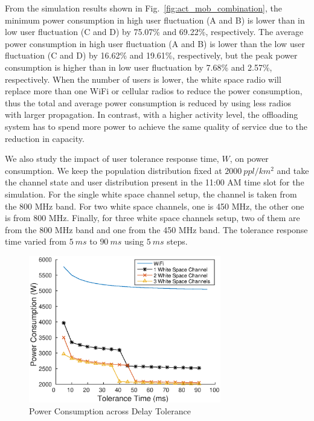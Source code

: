 From the simulation results shown in Fig.~\ref{fig:act_mob_combination}, the minimum power consumption in high user fluctuation (A and B) is lower than in low user fluctuation (C and D) by 75.07\% and 69.22\%, respectively.
The average power consumption in high user fluctuation (A and B) is lower than the low user fluctuation (C and D) by 16.62\% and 19.61\%, respectively, but the peak power consumption is higher than in low user fluctuation by 7.68\% and 2.57\%, respectively. 
When the number of users is lower, the white space radio will replace more than one WiFi or cellular radios to reduce the power consumption, thus the total and average power consumption is reduced by using less radios with larger propagation.
In contrast, with a higher activity level, the offloading system has to spend more power to achieve the same quality of service due to the reduction in capacity. 


We also study the impact of user tolerance response time, $W$, on power consumption. 
We keep the population distribution fixed at $2000\ ppl/km^2$ and take the channel state and user distribution present in the 11:00 AM time slot for the simulation.
For the single white space channel setup, the channel is taken from the 800 MHz band. 
For two white space channels, one is 450 MHz, the other one is from 800 MHz. 
Finally, for three white space channels setup, two of them are from the 800 MHz band and one from the 450 MHz band.
The tolerance response time varied from $5\ ms$ to $90\ ms$ using $5\ ms$ steps. 
 
\begin{figure}[hpt]
\vspace{-0.0in}
\centering
\includegraphics[width=84mm]{figures/delay_vary}
\vspace{-0.1in}
\caption{Power Consumption across Delay Tolerance}
\label{fig:delayvary}
\vspace{-0.1in}
\end{figure}

